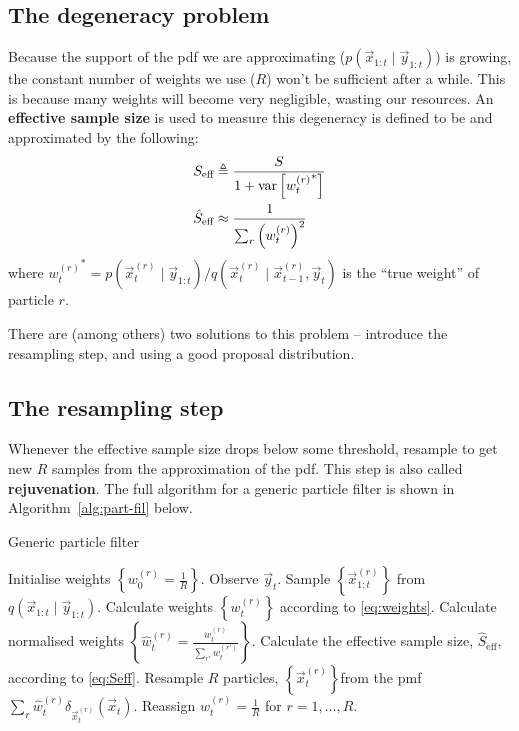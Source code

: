 \subsection{The degeneracy problem}
    Because the support of the pdf we are approximating ($p(\vec x_{1:t} \mid \vec y_{1:t})$) is growing, the constant number of weights we use ($R$) won't be sufficient after a while. This is because many weights will become very negligible, wasting our resources. An \textbf{effective sample size} is used to measure this degeneracy is defined to be and approximated by the following:
    \begin{align}
        S_\text{eff}        &\triangleq \frac{S}{1 + \operatorname{\mathrm{var}}\left[{w_t^{(r)}}^\ast\right]} \\
        \hat S_\text{eff}   &\approx \frac{1}{\sum_r \left(w_t^{(r)}\right)^2}\label{eq:Seff}
    \end{align}
    where ${w_t^{(r)}}^\ast = p(\vec x_t^{(r)} \mid \vec y_{1:t}) / q(\vec x_t^{(r)} \mid \vec x_{t-1}^{(r)}, \vec y_t)$ is the ``true weight'' of particle $r$.

    There are (among others) two solutions to this problem -- introduce the resampling step, and using a good proposal distribution.

\subsection{The resampling step}
    Whenever the effective sample size drops below some threshold, resample to get new $R$ samples from the approximation of the pdf. This step is also called \textbf{rejuvenation}. The full algorithm for a generic particle filter is shown in Algorithm~\ref{alg:part-fil} below.
    \begin{algorithm}
    \caption{Generic particle filter}\label{alg:part-fil}
        \begin{algorithmic}[1]
            \State Initialise weights $\left\{w_0^{(r)} = \frac{1}{R}\right\}$.
                \State Observe $\vec y_t$.
                \State Sample $\left\{\vec x_{1:t}^{(r)}\right\}$ from $q\left(\vec x_{1:t} \mid \vec y_{1:t}\right)$.
                \State Calculate weights $\left\{w_t^{(r)}\right\}$ according to \eqref{eq:weights}.
                \State Calculate normalised weights $\left\{\hat w_t^{(r)} = \frac{w_t^{(r)}}{\sum_{r'} w_t^{(r')}}\right\}$.
                \State Calculate the effective sample size, $\hat S_\text{eff}$, according to \eqref{eq:Seff}.
                    \State Resample $R$ particles, $\left\{\vec x_t^{(r)}\right\}$from the pmf $\sum_r \hat w_t^{(r)} \delta_{\vec x_t^{(r)}}(\vec x_t)$.
                    \State Reassign $w_t^{(r)} = \frac{1}{R}$ for $r = 1, \dotsc, R$.
                \EndIf
            \EndFor
        \end{algorithmic}
    \end{algorithm}

